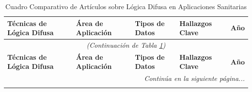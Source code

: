 \begin{longtable}{@{}p{3cm}p{2.5cm}p{2.5cm}p{4cm}p{1.5cm}@{}}
\caption{Cuadro Comparativo de Artículos sobre Lógica Difusa en Aplicaciones Sanitarias}
\label{tab:comparativo_logica_difusa} \\
\toprule
\fontsize{12}{14.4}\selectfont\textbf{Técnicas de Lógica Difusa} & \fontsize{12}{14.4}\selectfont\textbf{Área de Aplicación} & \fontsize{12}{14.4}\selectfont\textbf{Tipos de Datos} & \fontsize{12}{14.4}\selectfont\textbf{Hallazgos Clave} & \fontsize{12}{14.4}\selectfont\textbf{Año} \\
\midrule
\endfirsthead

\multicolumn{5}{c}{\textit{(Continuación de Tabla \ref{tab:comparativo_logica_difusa})}} \\
\toprule
\fontsize{12}{14.4}\selectfont\textbf{Técnicas de Lógica Difusa} & \fontsize{12}{14.4}\selectfont\textbf{Área de Aplicación} & \fontsize{12}{14.4}\selectfont\textbf{Tipos de Datos} & \fontsize{12}{14.4}\selectfont\textbf{Hallazgos Clave} & \fontsize{12}{14.4}\selectfont\textbf{Año} \\
\midrule
\endhead

\midrule
\multicolumn{5}{r}{\textit{Continúa en la siguiente página...}} \\
\endfoot


\end{longtable}
